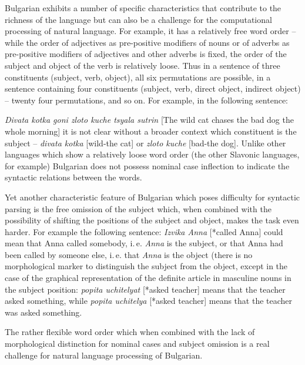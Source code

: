 \documentclass[]{../../metanetpaper}
\begin{document}
\begin{multicols}{2}

Bulgarian exhibits a number of specific characteristics that contribute to the richness of the language but can also be a challenge for the computational processing of natural language. For example, it has a relatively free word order – while the order of adjectives as pre-positive modifiers of nouns or of adverbs as pre-positive modifiers of adjectives and other adverbs is fixed, the order of the subject and object of the verb is relatively loose. Thus in a sentence of three constituents (subject, verb, object), all six permutations are possible, in a sentence containing four constituents (subject, verb, direct object, indirect object) -- twenty four permutations, and so on. For example, in the following sentence:

 \textit{{Divata kotka goni zloto kuche tsyala sutrin}} [The wild cat chases the bad dog the whole morning] it is not clear without a broader context which constituent is the subject -- \textit{{divata kotka}} [wild-the cat] or \textit{{zloto kuche}} [bad-the dog]. Unlike other languages which show a relatively loose word order (the other Slavonic languages, for example) Bulgarian does not possess nominal case inflection to indicate the syntactic relations between the words.

Yet another characteristic feature of Bulgarian which poses difficulty for syntactic parsing is the free omission of the subject which, when combined with the possibility of shifting the positions of the subject and object, makes the task even harder. For example the following sentence: \textit{{Izvika Anna}} [*called Anna] could mean that Anna called somebody, i.\,e.  \textit{Anna} is the subject, or that Anna had been called by someone else, i.\,e. that  \textit{Anna} is the object (there is no morphological marker to distinguish the subject from the object, except in the case of the graphical representation of the definite article in masculine nouns in the subject position: \textit{{popita uchitelyat}} [*asked teacher] means that the teacher asked something, while \textit{{popita uchitelya}} [*asked teacher] means that the teacher was asked something. 

The rather flexible word order which when combined with the lack of morphological distinction for nominal cases and subject omission is a real challenge for natural language processing of Bulgarian.


\end{multicols}
\end{document}
